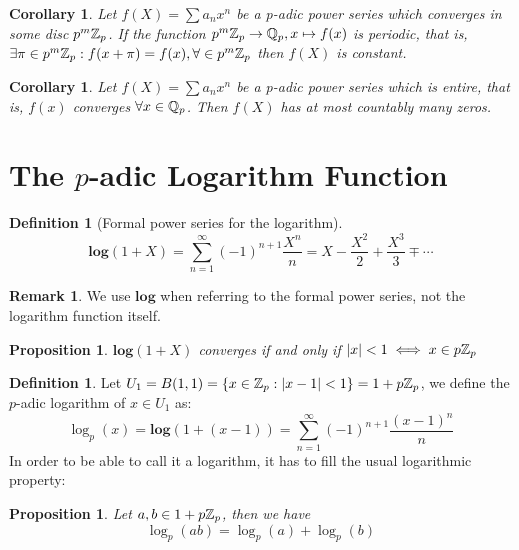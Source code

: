 \documentclass{article}
\theoremstyle{plain}
\newtheorem{prop}[thm]{Proposition}
\newtheorem{Cor}[thm]{Corollary}
\theoremstyle{definition}
\newtheorem{defi}[thm]{Definition}
\newtheorem{rem}[thm]{Remark}
\begin{document}
	\begin{minipage}[t]{0.45\textwidth}
		\begin{Cor}
		Let $f(X) = \sum a_{n}x^{n}$ be a p-adic power series which converges in some disc $p^{m}\Bbb Z_{p}$. If the function $p^{m}\Bbb Z_{p} \to \Bbb Q_{p}, x \mapsto f(x)$ is periodic, that is, $\exists \pi \in p^{m}\Bbb Z_{p} : f(x + \pi) = f(x), \forall \in p^{m}\Bbb Z_{p}$ then $f(X)$ is constant.
		\end{Cor}
		\begin{Cor}
		Let $f(X) = \sum a_{n}x^{n}$ be a p-adic power series which is entire, that is, $f(x)$ converges $\forall x \in \Bbb Q_{p}$. Then $f(X)$ has at most countably many zeros. %
		\end{Cor}
	\section{The $p$-adic Logarithm Function}
			\begin{defi}[Formal power series for the logarithm]
			$$\mathbf{log}(1+X) = \sum_{n=1}^{\infty} (-1)^{n+1}\frac {X^{n}}{n} = X - \frac{X^{2}}{2} + \frac{X^{3}}{3} \mp \cdots $$
			\end{defi}
			\begin{rem}
			We use $\mathbf{log}$ when referring to the formal power series, not the logarithm function itself.
			\end{rem}
			\begin{prop} $\mathbf{log}(1+X)$ converges if and only if $|x| < 1 \iff x \in p\Bbb Z_{p}$
			\end{prop}
			\begin{defi}Let $U_{1} = B(1,1) = \{x \in \Bbb Z_{p} : |x-1| < 1\} = 1+p\Bbb Z_{p}$, we define the $p$-adic logarithm of $x \in U_{1}$ as:
			$$\log_{p}(x) = \mathbf{log}(1+(x-1)) = \sum_{n=1}^{\infty} (-1)^{n+1}\frac {(x-1)^{n}}{n}$$
			In order to be able to call it a logarithm, it has to fill the usual logarithmic property:
			\end{defi}
			\begin{prop}
			Let $a, b \in 1+p\Bbb Z_{p}$, then we have
			$$\log_{p}(ab) = \log_{p}(a) + \log_{p}(b)$$
			\end{prop}
	\end{minipage}%
	\hfill
\end{document}
